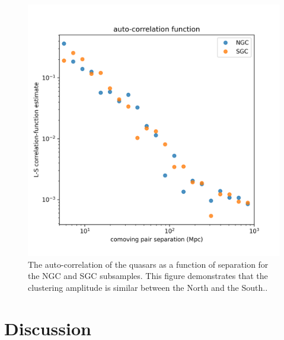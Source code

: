 \documentclass[modern]{aastex631}
\newlength{\figurewidth}
\begin{document}
\begin{figure}[t!]
  \begin{mdframed}
  \color{captiongray}
  \begin{center}
    \includegraphics[width=\figurewidth]{notebooks/corrfunc.png}
  \end{center}
    \caption{The auto-correlation of the quasars as a function of separation for the NGC and SGC subsamples.
    This figure demonstrates that the clustering amplitude is similar between the North and the South.\label{fig:corrfunc}.}
  \end{mdframed}
\end{figure}

\section{Discussion}
\end{document}
